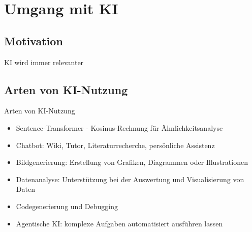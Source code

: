 \documentclass[aspectratio=\BeamerAspectRatio]{beamer}
\begin{document}
\maketitlepage

\section{Umgang mit KI}\label{sec:ki}

\subsection{Motivation}
\begin{frame}{KI wird immer relevanter}

\end{frame}

\subsection{Arten von KI-Nutzung}
\begin{frame}{Arten von KI-Nutzung}
  \begin{itemize}
    \item Sentence-Transformer - Kosinus-Rechnung für Ähnlichkeitsanalyse
    \item Chatbot: Wiki, Tutor, Literaturrecherche, persönliche Assistenz
    \item Bildgenerierung: Erstellung von Grafiken, Diagrammen oder Illustrationen
    \item Datenanalyse: Unterstützung bei der Auswertung und Visualisierung von Daten
    \item Codegenerierung und Debugging
    \item Agentische KI: komplexe Aufgaben automatisiert ausführen lassen
  \end{itemize}
\end{frame}
\end{document}
